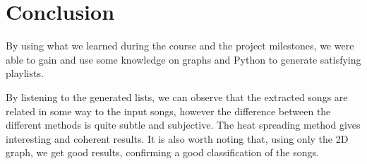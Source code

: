 \documentclass[11pt,a4paper,twoside]{article}
\begin{document}
\section{Conclusion}
By using what we learned during the course and the project milestones, we were able to gain and use some knowledge on graphs and Python to generate satisfying playlists.

By listening to the generated lists, we can observe that the extracted songs are related in some way to the input songs, however the difference between the different methods is quite subtle and subjective. The heat spreading method gives interesting and coherent results. 
It is also worth noting that, using only the 2D graph, we get good results, confirming a good classification of the songs. 



{}

\end{document}
